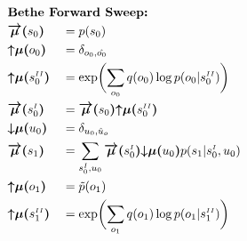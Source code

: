 \documentclass[fleqn]{article}
\begin{document}
\noindent
\setlength{\jot}{0.7em}
\begin{minipage}[t]{0.5\textwidth}
    \begin{alignat}{2}
         & \rlap{\text{\bfseries Bethe Forward Sweep:}} \nonumber                                                                                                                                                                                         \\
         & \bm{\overrightarrow{\mu}(}s_0\bm{)}                        &  & = p(s_0)                                                                                                                                                                       \\
         & \bm{{\uparrow}{\mu}(}o_0\bm{)}                             &  & = \delta_{o_0, \hat{o_0}}                                                                                                                                                      \\
         & \bm{{\uparrow}{\mu}(}s^{\scriptscriptstyle II}_0\bm{)}     &  & = \exp \biggl(\sum_{o_0} q(o_0)\log p(o_0|s^{\scriptscriptstyle II}_0)\biggr)                                                                                                  \\
         & \bm{\overrightarrow{\mu}(}s^{\scriptscriptstyle I}_0\bm{)} &  & = \bm{\overrightarrow{\mu}(}s_0\bm{)} \bm{{\uparrow}{\mu}(}s^{\scriptscriptstyle II}_0\bm{)}                                                                                   \\
         & \bm{{\downarrow}{\mu}(}u_0\bm{)}                           &  & = \delta_{u_0,\hat{u}_o}                                                                                                                                                       \\
         & \bm{\overrightarrow{\mu}(}s_1\bm{)}                        &  & = \sum_{s^{\scriptscriptstyle I}_0, u_0} \bm{\overrightarrow{\mu}(}s^{\scriptscriptstyle I}_0\bm{)} \bm{{\downarrow}{\mu}(}u_0\bm{)} p(s_1|{s^{\scriptscriptstyle I}_0},u_0)   \\
         & \bm{{\uparrow}{\mu}(}o_1\bm{)}                             &  & = \tilde{p}(o_1)                                                                                                                                                               \\
         & \bm{{\uparrow}{\mu}(}s^{\scriptscriptstyle II}_1\bm{)}     &  & = \exp \biggl(\sum_{o_1} q(o_1)\log p(o_1|s^{\scriptscriptstyle II}_1)\biggr)                                                                                                  \\

\end{alignat}
\end{minipage}
\end{document}
